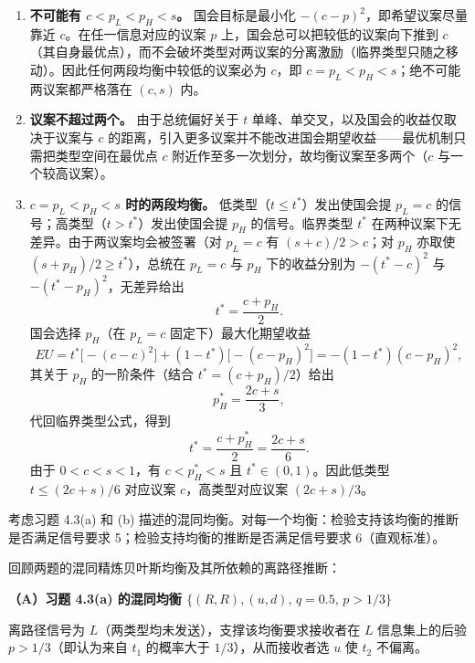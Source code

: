 \begin{enumerate}[leftmargin=1.6em, label=\arabic*.]
  \item \textbf{不可能有 $c<p_L<p_H<s$。} 国会目标是最小化 $-(c-p)^2$，即希望议案尽量靠近 $c$。在任一信息对应的议案 $p$ 上，国会总可以把较低的议案向下推到 $c$（其自身最优点），而不会破坏类型对两议案的分离激励（临界类型只随之移动）。因此任何两段均衡中较低的议案必为 $c$，即 $c=p_L<p_H<s$；绝不可能两议案都严格落在 $(c,s)$ 内。
  \item \textbf{议案不超过两个。} 由于总统偏好关于 $t$ 单峰、单交叉，以及国会的收益仅取决于议案与 $c$ 的距离，引入更多议案并不能改进国会期望收益——最优机制只需把类型空间在最优点 $c$ 附近作至多一次划分，故均衡议案至多两个（$c$ 与一个较高议案）。
  \item \textbf{$c=p_L<p_H<s$ 时的两段均衡。} 低类型（$t\le t^*$）发出使国会提 $p_L=c$ 的信号；高类型（$t>t^*$）发出使国会提 $p_H$ 的信号。临界类型 $t^*$ 在两种议案下无差异。由于两议案均会被签署（对 $p_L=c$ 有 $(s+c)/2>c$；对 $p_H$ 亦取使 $(s+p_H)/2\ge t^*$），总统在 $p_L=c$ 与 $p_H$ 下的收益分别为 $-(t^*-c)^2$ 与 $-(t^*-p_H)^2$，无差异给出
  \[
    t^*=\frac{c+p_H}{2}.
  \]\indent
  国会选择 $p_H$（在 $p_L=c$ 固定下）最大化期望收益
  \[
    EU=t^*\bigl[-(c-c)^2\bigr]+(1-t^*)\bigl[-(c-p_H)^2\bigr]
        =-(1-t^*)(c-p_H)^2,
  \]\indent
  其关于 $p_H$ 的一阶条件（结合 $t^*=(c+p_H)/2$）给出
  \[
    p_H^*=\frac{2c+s}{3},
  \]\indent
    代回临界类型公式，得到
    \[
      t^*=\frac{c+p_H^*}{2}=\frac{2c+s}{6}.
    \]
    \indent 由于 $0<c<s<1$，有 $c<p_H^*<s$ 且 $t^*\in(0,1)$。因此低类型 $t\le (2c+s)/6$ 对应议案 $c$，高类型对应议案 $(2c+s)/3$。
\end{enumerate}

考虑习题 4.3(a) 和 (b) 描述的混同均衡。对每一个均衡：检验支持该均衡的推断是否满足信号要求 5；检验支持均衡的推断是否满足信号要求 6（直观标准）。

\sol 回顾两题的混同精炼贝叶斯均衡及其所依赖的离路径推断：

\noindent\textbf{（A）习题 4.3(a) 的混同均衡 $\{(R,R),(u,d),\,q=0.5,\,p>1/3\}$}

离路径信号为 $L$（两类型均未发送），支撑该均衡要求接收者在 $L$ 信息集上的后验 $p>1/3$（即认为来自 $t_1$ 的概率大于 $1/3$），从而接收者选 $u$ 使 $t_2$ 不偏离。


